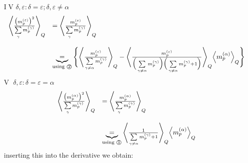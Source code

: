 \documentclass[a4paper,11pt]{article}
\begin{document}
\textcircled{IV} $\delta, \varepsilon: \delta = \varepsilon; \delta, \varepsilon \neq \alpha$
\begin{equation}
	\begin{array}{ll}
		\Bigg< \frac{\big( m_p^{(\varepsilon)} \big)^2 }{
				\sum\limits_\gamma m_p^{(\gamma)}} \Bigg>_Q
		& = \Bigg< \frac{m_p^{(\varepsilon)} }{
				\sum\limits_\gamma m_p^{(\gamma)}} \Bigg>_Q \\\\
		& \underbrace{=}_{\text{using \textcircled{2}}}
			\Bigg\{ \Bigg< \frac{m_p^{(\varepsilon)} }{
				\sum\limits_{\gamma \neq \alpha}
				m_p^{(\gamma)}} \Bigg>_Q
			- \Bigg< \frac{m_p^{(\varepsilon)}}{
		\Big(\sum\limits_{\gamma \neq \alpha} m_p^{(\gamma)} \Big)
		\Big(\sum\limits_{\gamma \neq \alpha} m_p^{(\gamma)} + 1 \Big)}
		\Bigg>_Q \Big< m_p^{(\alpha)} \Big>_Q
			\Bigg\}
	\end{array}
\end{equation}
\textcircled{V} $\delta, \varepsilon: \delta = \varepsilon = \alpha$
\begin{equation}
	\begin{array}{ll}
	\Bigg< \frac{\big( m_p^{(\alpha)} \big)^2 }{
				\sum\limits_\gamma m_p^{(\gamma)}} \Bigg>_Q
		& = \Bigg< \frac{m_p^{(\alpha)} }{
				\sum\limits_\gamma m_p^{(\gamma)}} \Bigg>_Q \\\\
		& \underbrace{=}_{\text{using \textcircled{1}}}
			\Bigg< \frac{1}{\sum\limits_{\gamma \neq \alpha} 
				m_p^{(\gamma)} + 1}
			\Bigg>_Q \Big< m_p^{(\alpha)} \Big>_Q
	\end{array}
\end{equation}
inserting this into the derivative we obtain:
\end{document}
